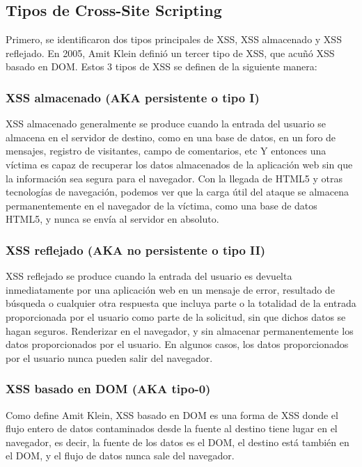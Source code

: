 \subsection{Tipos de Cross-Site Scripting}

\cite{typexss} Primero, se identificaron dos tipos principales de XSS, XSS almacenado y XSS reflejado. En 2005, Amit Klein definió un tercer tipo de XSS, que acuñó XSS basado en DOM. Estos 3 tipos de XSS se definen de la siguiente manera: \\

    \subsubsection{XSS almacenado (AKA persistente o tipo I)}

    XSS almacenado generalmente se produce cuando la entrada del usuario se almacena en el servidor de destino, como en una base de datos, en un foro de mensajes, registro de visitantes, campo de comentarios, etc Y entonces una víctima es capaz de recuperar los datos almacenados de la aplicación web sin que la información sea segura para el navegador. Con la llegada de HTML5 y otras tecnologías de navegación, podemos ver que la carga útil del ataque se almacena permanentemente en el navegador de la víctima, como una base de datos HTML5, y nunca se envía al servidor en absoluto. \\

    \subsubsection{XSS reflejado (AKA no persistente o tipo II)}

    XSS reflejado se produce cuando la entrada del usuario es devuelta inmediatamente por una aplicación web en un mensaje de error, resultado de búsqueda o cualquier otra respuesta que incluya parte o la totalidad de la entrada proporcionada por el usuario como parte de la solicitud, sin que dichos datos se hagan seguros. Renderizar en el navegador, y sin almacenar permanentemente los datos proporcionados por el usuario. En algunos casos, los datos proporcionados por el usuario nunca pueden salir del navegador. \\

    \subsubsection{XSS basado en DOM (AKA tipo-0)}

    Como define Amit Klein, XSS basado en DOM es una forma de XSS donde el flujo entero de datos contaminados desde la fuente al destino tiene lugar en el navegador, es decir, la fuente de los datos es el DOM, el destino está también en el DOM, y el flujo de datos nunca sale del navegador. \\
